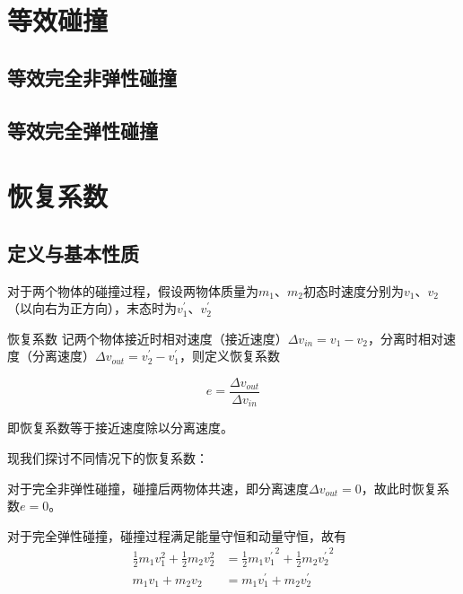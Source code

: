 \section{等效碰撞}

\subsection{等效完全非弹性碰撞}

\subsection{等效完全弹性碰撞}

\section{恢复系数}

\subsection{定义与基本性质}



对于两个物体的碰撞过程，假设两物体质量为$m_1$、$m_2$初态时速度分别为$v_1$、$v_2$（以向右为正方向），末态时为$v_1^{\prime}$、$v_2^{\prime}$

\begin{defi}{恢复系数}{}
记两个物体接近时相对速度（接近速度）$\Delta v_{in} = v_1-v_2$，分离时相对速度（分离速度）$\Delta v_{out} = v_2^{\prime}-v_1^{\prime}$，则定义恢复系数

$$e = \frac{\Delta v_{out}}{\Delta v_{in}}$$

即恢复系数等于接近速度除以分离速度。
\end{defi}

现我们探讨不同情况下的恢复系数：

对于完全非弹性碰撞，碰撞后两物体共速，即分离速度$\Delta v_{out} = 0$，故此时恢复系数$e=0$。

对于完全弹性碰撞，碰撞过程满足能量守恒和动量守恒，故有
\begin{subequations}
\begin{align}
\label{e_eq1}
\frac{1}{2} m_1 v_1^2 + \frac{1}{2} m_2 v_2^2 &= \frac{1}{2} m_1 {v_1^{\prime}}^2 + \frac{1}{2} m_2 {v_2^{\prime}}^2 \\
\label{e_eq2}
m_1 v_1 + m_2 v_2 &= m_1 v_1^{\prime} + m_2 v_2^{\prime} 
\end{align}
\end{subequations}

